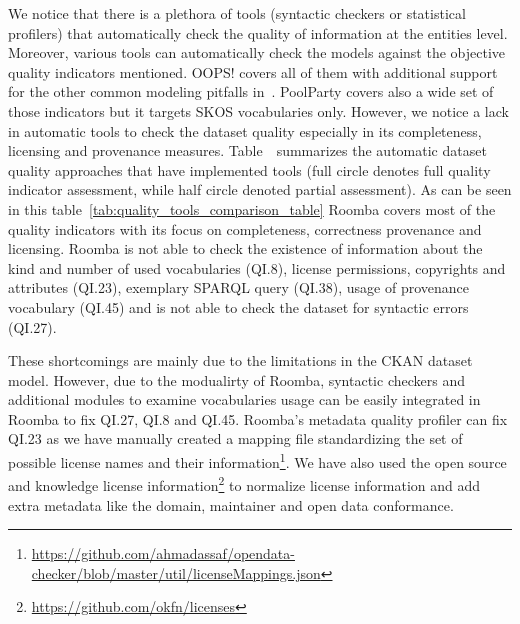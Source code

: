 \documentclass[onecolumn, crcready]{../../Tools/LaTEX/iosart2c}
\begin{document}
\indent We notice that there is a plethora of tools (syntactic checkers or statistical profilers) that automatically check the quality of information at the entities level. Moreover, various tools can automatically check the models against the objective quality indicators mentioned. OOPS! covers all of them with additional support for the other common modeling pitfalls in~\cite{Maria:KEOD:13}. PoolParty covers also a wide set of those indicators but it targets SKOS vocabularies only. However, we notice a lack in automatic tools to check the dataset quality especially in its completeness, licensing and provenance measures. Table~\ summarizes the automatic dataset quality approaches that have implemented tools (full circle denotes full quality indicator assessment, while half circle denoted partial assessment). As can be seen in this table~\ref{tab:quality_tools_comparison_table} Roomba covers most of the quality indicators with its focus on completeness, correctness provenance and licensing. Roomba is not able to check the existence of information about the kind and number of used vocabularies (QI.8), license permissions, copyrights and attributes (QI.23), exemplary SPARQL query (QI.38), usage of provenance vocabulary (QI.45) and is not able to check the dataset for syntactic errors (QI.27).

These shortcomings are mainly due to the limitations in the CKAN dataset model. However, due to the modualirty of Roomba, syntactic checkers and additional modules to examine vocabularies usage can be easily integrated in Roomba to fix QI.27, QI.8 and QI.45. Roomba's metadata quality profiler can fix QI.23 as we have manually created a mapping file standardizing the set of possible license names and their information\footnote{\url{https://github.com/ahmadassaf/opendata-checker/blob/master/util/licenseMappings.json}}. We have also used the open source and knowledge license information\footnote{\url{https://github.com/okfn/licenses}} to normalize license information and add extra metadata like the domain, maintainer and open data conformance.
\end{document}
